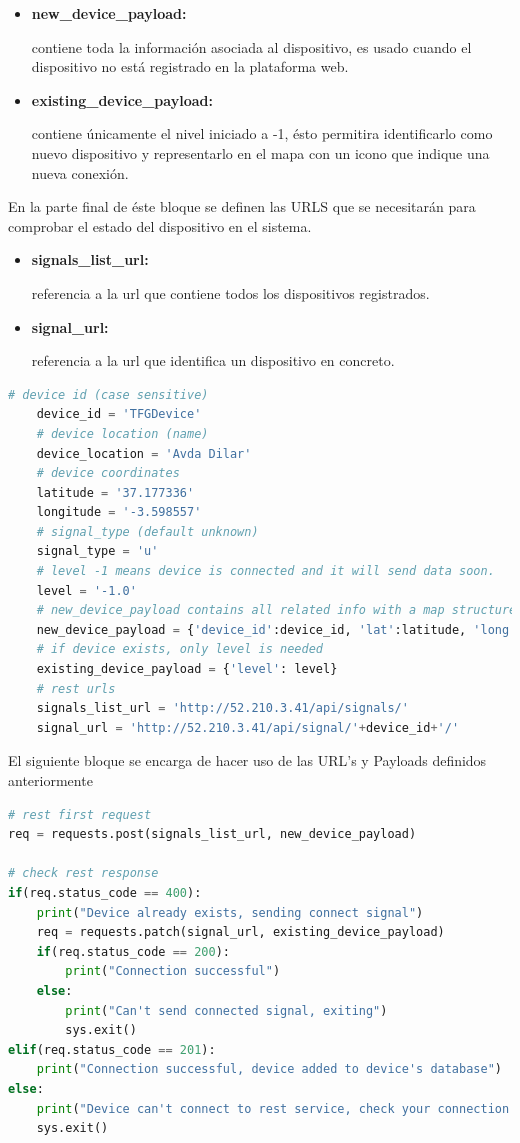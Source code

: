 \begin{itemize}
	\item \textbf{new\_device\_payload:}

	contiene toda la información asociada al dispositivo, es usado cuando el dispositivo no está registrado en la plataforma web.
	\item \textbf{existing\_device\_payload:}

	contiene únicamente el nivel iniciado a -1, ésto permitira identificarlo como nuevo dispositivo y representarlo en el mapa con un icono que indique una nueva conexión.
\end{itemize}

En la parte final de éste bloque se definen las URLS que se necesitarán para comprobar el estado del dispositivo en el sistema.

\begin{itemize}
	\item \textbf{signals\_list\_url: }

	referencia a la url que contiene todos los dispositivos registrados.
	\item \textbf{signal\_url: }

	referencia a la url que identifica un dispositivo en concreto.
\end{itemize}

\begin{lstlisting}[language=python,caption={Parámetros usados para la comunicación con la API},label={lst:pi1}]
	# device id (case sensitive)
	device_id = 'TFGDevice'
	# device location (name)
	device_location = 'Avda Dilar'
	# device coordinates
	latitude = '37.177336'
	longitude = '-3.598557'
	# signal_type (default unknown)
	signal_type = 'u'
	# level -1 means device is connected and it will send data soon.
	level = '-1.0'
	# new_device_payload contains all related info with a map structure
	new_device_payload = {'device_id':device_id, 'lat':latitude, 'long':longitude, 'level':level, 'type':signal_type}
	# if device exists, only level is needed
	existing_device_payload = {'level': level}
	# rest urls
	signals_list_url = 'http://52.210.3.41/api/signals/'
	signal_url = 'http://52.210.3.41/api/signal/'+device_id+'/'
\end{lstlisting}

El siguiente bloque se encarga de hacer uso de las URL's y Payloads definidos anteriormente

\begin{lstlisting}[language=python,caption={Identificación de dispositivo mediante la API},label={lst:pi1}]
# rest first request
req = requests.post(signals_list_url, new_device_payload)

# check rest response
if(req.status_code == 400):
    print("Device already exists, sending connect signal")
    req = requests.patch(signal_url, existing_device_payload)
    if(req.status_code == 200):
        print("Connection successful")
    else:
        print("Can't send connected signal, exiting")
        sys.exit()
elif(req.status_code == 201):
    print("Connection successful, device added to device's database")
else:
    print("Device can't connect to rest service, check your connection.")
    sys.exit()
\end{lstlisting}

